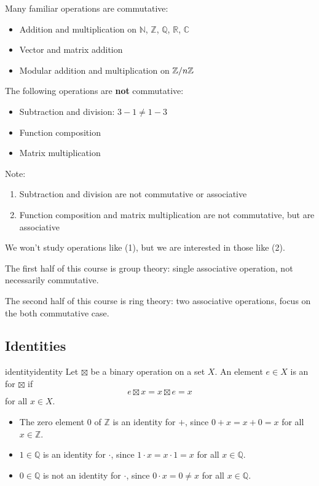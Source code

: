 \documentclass[12pt,letterpaper]{report}
\begin{document}
Many familiar operations are commutative:
\begin{itemize}
  \item
  Addition and multiplication on $\mathbb{N}$, $\mathbb{Z}$, $\mathbb{Q}$, $\mathbb{R}$,
  $\mathbb{C}$
  \item
  Vector and matrix addition
  \item
  Modular addition and multiplication on $\mathbb{Z}/{n}\mathbb{Z}$
\end{itemize}
The following operations are \textbf{not} commutative:
\begin{itemize}
  \item Subtraction and division: $3 - 1 \neq 1 - 3$
  \item Function composition
  \item Matrix multiplication
\end{itemize}

Note:
\begin{enumerate}
  \item Subtraction and division are not commutative or associative
  \item Function composition and matrix multiplication are not commutative, but are associative
\end{enumerate}
We won't study operations like (1), but we are interested in those like (2).

The first half of this course is group theory: single associative operation, not necessarily
commutative.

The second half of this course is ring theory: two associative operations, focus on the both
commutative case.

\pagebreak
\subsection{Identities}

\begin{defn}{identity}{identity}
  Let $\boxtimes$ be a binary operation on a set $X$.
  An element $e \in X$ is an  for $\boxtimes$ if
  \[ e \boxtimes x = x \boxtimes e = x \]
  for all $x \in X$.
\end{defn}

\begin{ex}
  \begin{itemize}
    \item
    The zero element $0$ of $\mathbb{Z}$ is an identity for $+$, since $0 + x = x + 0 = x$ for all
    $x \in \mathbb{Z}$.
    \item
    $1 \in \mathbb{Q}$ is an identity for $\cdot$, since $1 \cdot x = x \cdot 1 = x$ for all
    $x \in \mathbb{Q}$.
    \item
    $0 \in \mathbb{Q}$ is not an identity for $\cdot$, since $0 \cdot x = 0 \neq x$ for all
    $x \in \mathbb{Q}$.
  \end{itemize}
\end{ex}
\end{document}
